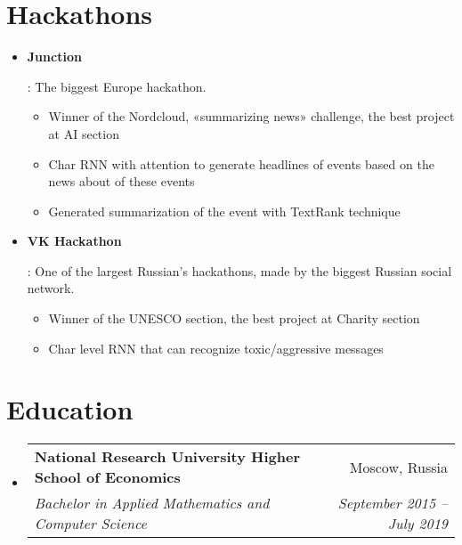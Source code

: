 \documentclass[letterpaper,11pt]{article}
\makeatletter
\newcommand{\resumeItem}[2]{
  \item\small{
    \textbf{#1}{: #2 \vspace{-2pt}}
  }
}
\newcommand{\resumeSubheading}[4]{
  \vspace{-1pt}\item
    \begin{tabular*}{0.97\textwidth}{l@{\extracolsep{\fill}}r}
      \textbf{#1} & #2 \\
      \textit{\small#3} & \textit{\small #4} \\
    \end{tabular*}\vspace{-5pt}
}
\newcommand{\resumeSubItem}[2]{\resumeItem{#1}{#2}\vspace{-4pt}}
\newcommand{\resumeSubHeadingListStart}{\begin{itemize}[leftmargin=*]}
\newcommand{\resumeSubHeadingListEnd}{\end{itemize}}
\makeatother
\begin{document}
\section{Hackathons}
  \resumeSubHeadingListStart
    \resumeSubItem{Junction}
      {
      	The biggest Europe hackathon.
        \begin{itemize}
            \item Winner of the Nordcloud, «summarizing news» challenge, the best project at AI section
            \item Char RNN with attention to generate headlines of events based on the news about of these events
            \item Generated summarization of the event with TextRank technique
        \end{itemize}
      }
    \resumeSubItem{VK Hackathon}
      {
      	One of the largest Russian's hackathons, made by the biggest Russian social network.
        \begin{itemize}
        	\item Winner of the UNESCO section, the best project at Charity section
            \item Char level RNN that can recognize toxic/aggressive messages
        \end{itemize}
      }
  \resumeSubHeadingListEnd
  

\section{Education}
  \resumeSubHeadingListStart
    \resumeSubheading
      {National Research University Higher School of Economics}{Moscow, Russia}
      {Bachelor in Applied Mathematics and Computer Science}{September 2015 -- July 2019}
  \resumeSubHeadingListEnd

%
\end{document}
